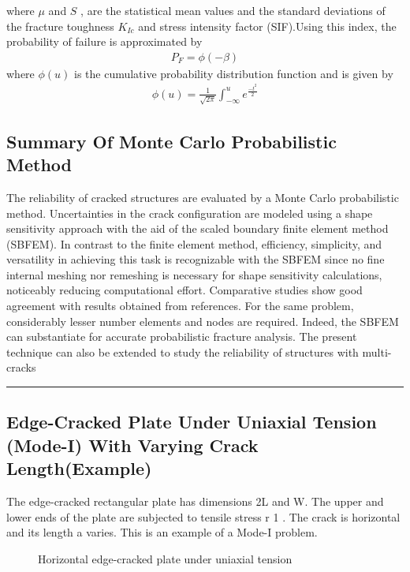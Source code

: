 \documentclass[12pt]{article}
\begin{document}
where $\mu$ and $S$ , are the statistical mean values and the standard deviations of the fracture toughness $K_{Ic}$ and
stress intensity factor (SIF).Using this index, the probability of failure is approximated by
\begin{align*}
    P_F = \phi(-\beta) \tag{33}
\end{align*}
where $\phi(u)$ is the cumulative probability distribution function and is given by
\begin{align*}
    \phi(u) = \frac{1}{\sqrt{2 \pi}}\int_{-\infty}^{u} e^{\frac{-t^2}{2}}  \tag{34}
\end{align*}
\subsection{Summary Of Monte Carlo Probabilistic Method}
The reliability of cracked structures are evaluated by a Monte Carlo probabilistic method. Uncertainties in the crack configuration 
are modeled using a shape sensitivity approach with the aid of the scaled boundary finite element method
(SBFEM). In contrast to the finite element method, efficiency, simplicity, and versatility in achieving this task is recognizable
with the SBFEM since no fine internal meshing nor remeshing is necessary for shape sensitivity calculations, noticeably
reducing computational effort. Comparative studies show good agreement with results obtained from references. For the
same problem, considerably lesser number elements and nodes are required. Indeed, the SBFEM can substantiate for 
accurate probabilistic fracture analysis. The present technique can also be extended to study the reliability of structures with
multi-cracks


\rule{\textwidth}{.1em}
\subsection{Edge-Cracked Plate Under Uniaxial Tension (Mode-I) With Varying Crack Length(Example)}
The edge-cracked rectangular plate has dimensions 2L and W. The upper and lower ends of the plate are subjected
to tensile stress r 1 . The crack is horizontal and its length a varies. This is an example of a Mode-I problem.

\begin{figure}[H]
    \centering
    \captionsetup{labelformat=empty}
    \caption{Horizontal edge-cracked plate under uniaxial tension}  
\end{figure}
\end{document}
